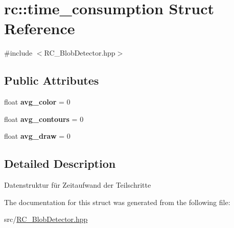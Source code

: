 \hypertarget{structrc_1_1time__consumption}{\section{rc\+:\+:time\+\_\+consumption Struct Reference}
\label{structrc_1_1time__consumption}
}


{\ttfamily \#include $<$R\+C\+\_\+\+Blob\+Detector.\+hpp$>$}

\subsection*{Public Attributes}
\begin{DoxyCompactItemize}
\item 
\hypertarget{structrc_1_1time__consumption_af6c0bde60b738f03712474c1806cc220}{float {\bfseries avg\+\_\+color} = 0}\label{structrc_1_1time__consumption_af6c0bde60b738f03712474c1806cc220}

\item 
\hypertarget{structrc_1_1time__consumption_a0489745a27d37811eb1e92b42b3c4177}{float {\bfseries avg\+\_\+contours} = 0}\label{structrc_1_1time__consumption_a0489745a27d37811eb1e92b42b3c4177}

\item 
\hypertarget{structrc_1_1time__consumption_afd38ef6d81f21860ab5c1a219f0e2bc5}{float {\bfseries avg\+\_\+draw} = 0}\label{structrc_1_1time__consumption_afd38ef6d81f21860ab5c1a219f0e2bc5}

\end{DoxyCompactItemize}


\subsection{Detailed Description}
Datenstruktur für Zeitaufwand der Teilschritte 

The documentation for this struct was generated from the following file\+:\begin{DoxyCompactItemize}
\item 
src/\hyperlink{RC__BlobDetector_8hpp}{R\+C\+\_\+\+Blob\+Detector.\+hpp}\end{DoxyCompactItemize}
